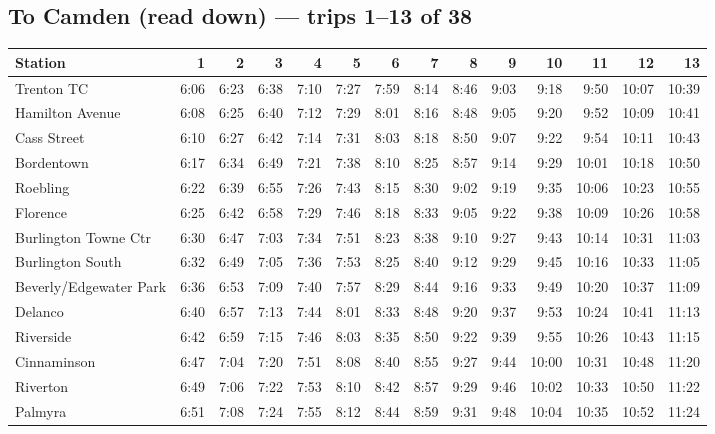 \subsection*{To Camden (read down) --- trips 1--13 of 38}
\begin{center}\footnotesize\setlength{\tabcolsep}{3pt}\begin{tabular}{@{}lrrrrrrrrrrrrr@{}}\toprule
Station & 1 & 2 & 3 & 4 & 5 & 6 & 7 & 8 & 9 & 10 & 11 & 12 & 13 \\\midrule
Trenton TC & 6:06 & 6:23 & 6:38 & 7:10 & 7:27 & 7:59 & 8:14 & 8:46 & 9:03 & 9:18 & 9:50 & 10:07 & 10:39 \\
Hamilton Avenue & 6:08 & 6:25 & 6:40 & 7:12 & 7:29 & 8:01 & 8:16 & 8:48 & 9:05 & 9:20 & 9:52 & 10:09 & 10:41 \\
Cass Street & 6:10 & 6:27 & 6:42 & 7:14 & 7:31 & 8:03 & 8:18 & 8:50 & 9:07 & 9:22 & 9:54 & 10:11 & 10:43 \\
Bordentown & 6:17 & 6:34 & 6:49 & 7:21 & 7:38 & 8:10 & 8:25 & 8:57 & 9:14 & 9:29 & 10:01 & 10:18 & 10:50 \\
Roebling & 6:22 & 6:39 & 6:55 & 7:26 & 7:43 & 8:15 & 8:30 & 9:02 & 9:19 & 9:35 & 10:06 & 10:23 & 10:55 \\
Florence & 6:25 & 6:42 & 6:58 & 7:29 & 7:46 & 8:18 & 8:33 & 9:05 & 9:22 & 9:38 & 10:09 & 10:26 & 10:58 \\
Burlington Towne Ctr & 6:30 & 6:47 & 7:03 & 7:34 & 7:51 & 8:23 & 8:38 & 9:10 & 9:27 & 9:43 & 10:14 & 10:31 & 11:03 \\
Burlington South & 6:32 & 6:49 & 7:05 & 7:36 & 7:53 & 8:25 & 8:40 & 9:12 & 9:29 & 9:45 & 10:16 & 10:33 & 11:05 \\
Beverly/Edgewater Park & 6:36 & 6:53 & 7:09 & 7:40 & 7:57 & 8:29 & 8:44 & 9:16 & 9:33 & 9:49 & 10:20 & 10:37 & 11:09 \\
Delanco & 6:40 & 6:57 & 7:13 & 7:44 & 8:01 & 8:33 & 8:48 & 9:20 & 9:37 & 9:53 & 10:24 & 10:41 & 11:13 \\
Riverside & 6:42 & 6:59 & 7:15 & 7:46 & 8:03 & 8:35 & 8:50 & 9:22 & 9:39 & 9:55 & 10:26 & 10:43 & 11:15 \\
Cinnaminson & 6:47 & 7:04 & 7:20 & 7:51 & 8:08 & 8:40 & 8:55 & 9:27 & 9:44 & 10:00 & 10:31 & 10:48 & 11:20 \\
Riverton & 6:49 & 7:06 & 7:22 & 7:53 & 8:10 & 8:42 & 8:57 & 9:29 & 9:46 & 10:02 & 10:33 & 10:50 & 11:22 \\
Palmyra & 6:51 & 7:08 & 7:24 & 7:55 & 8:12 & 8:44 & 8:59 & 9:31 & 9:48 & 10:04 & 10:35 & 10:52 & 11:24 \\

\end{tabular}
\end{center}
